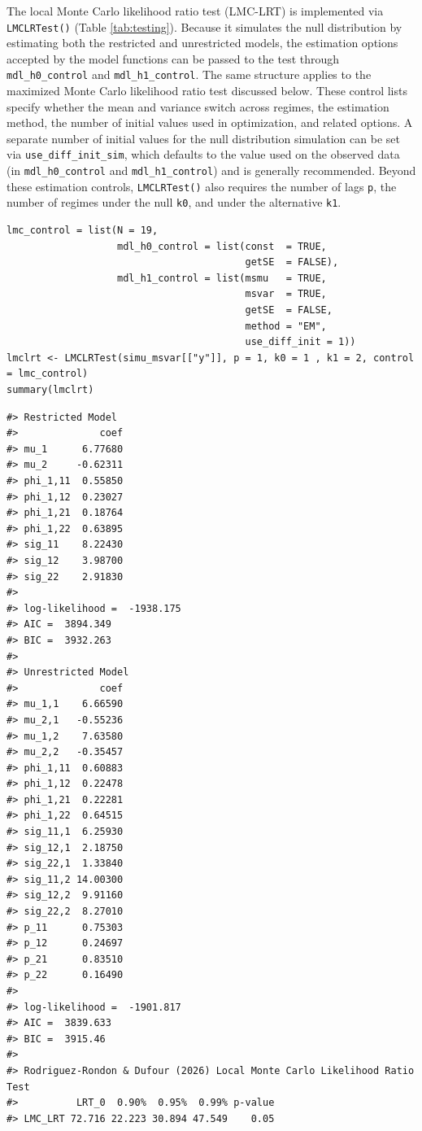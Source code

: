 The local Monte Carlo likelihood ratio test (LMC-LRT) is implemented via \texttt{LMCLRTest()} (Table \ref{tab:testing}). Because it simulates the null distribution by estimating both the restricted and unrestricted models, the estimation options accepted by the model functions can be passed to the test through \texttt{mdl\_h0\_control} and \texttt{mdl\_h1\_control}. The same structure applies to the maximized Monte Carlo likelihood ratio test discussed below. These control lists specify whether the mean and variance switch across regimes, the estimation method, the number of initial values used in optimization, and related options. A separate number of initial values for the null distribution simulation can be set via \texttt{use\_diff\_init\_sim}, which defaults to the value used on the observed data (in \texttt{mdl\_h0\_control} and \texttt{mdl\_h1\_control}) and is generally recommended. Beyond these estimation controls, \texttt{LMCLRTest()} also requires the number of lags \texttt{p}, the number of regimes under the null \texttt{k0}, and under the alternative \texttt{k1}.

\begin{verbatim}
lmc_control = list(N = 19,
                   mdl_h0_control = list(const  = TRUE,
                                         getSE  = FALSE),
                   mdl_h1_control = list(msmu   = TRUE,
                                         msvar  = TRUE,
                                         getSE  = FALSE,
                                         method = "EM",
                                         use_diff_init = 1))
lmclrt <- LMCLRTest(simu_msvar[["y"]], p = 1, k0 = 1 , k1 = 2, control = lmc_control)
summary(lmclrt)
\end{verbatim}

\begin{verbatim}
#> Restricted Model
#>              coef
#> mu_1      6.77680
#> mu_2     -0.62311
#> phi_1,11  0.55850
#> phi_1,12  0.23027
#> phi_1,21  0.18764
#> phi_1,22  0.63895
#> sig_11    8.22430
#> sig_12    3.98700
#> sig_22    2.91830
#> 
#> log-likelihood =  -1938.175
#> AIC =  3894.349
#> BIC =  3932.263
#> 
#> Unrestricted Model
#>              coef
#> mu_1,1    6.66590
#> mu_2,1   -0.55236
#> mu_1,2    7.63580
#> mu_2,2   -0.35457
#> phi_1,11  0.60883
#> phi_1,12  0.22478
#> phi_1,21  0.22281
#> phi_1,22  0.64515
#> sig_11,1  6.25930
#> sig_12,1  2.18750
#> sig_22,1  1.33840
#> sig_11,2 14.00300
#> sig_12,2  9.91160
#> sig_22,2  8.27010
#> p_11      0.75303
#> p_12      0.24697
#> p_21      0.83510
#> p_22      0.16490
#> 
#> log-likelihood =  -1901.817
#> AIC =  3839.633
#> BIC =  3915.46
#> 
#> Rodriguez-Rondon & Dufour (2026) Local Monte Carlo Likelihood Ratio Test
#>          LRT_0  0.90%  0.95%  0.99% p-value
#> LMC_LRT 72.716 22.223 30.894 47.549    0.05
\end{verbatim}

